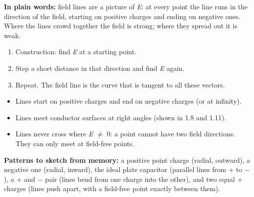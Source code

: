 \documentclass[11pt]{article}
\begin{document}
\begin{keepsection}
\begin{center}
\begin{minipage}[t]{0.950\linewidth}
\par{}\end{minipage}
\end{center}

\begin{plainbox}\textbf{In plain words:} field lines are a picture of \textit{E}: at every point the line runs in the direction of the field, starting on positive charges and ending on negative ones. Where the lines crowd together the field is strong; where they spread out it is weak.\end{plainbox}

\begin{enumerate}
\item Construction: find \textit{E} at a starting point.
\item Step a short distance in that direction and find \textit{E} again.
\item Repeat. The field line is the curve that is tangent to all these vectors.
\end{enumerate}

\begin{itemize}
\item Lines start on positive charges and end on negative charges (or at infinity).
\item Lines meet conductor surfaces at right angles (shown in 1.8 and 1.11).
\item Lines never cross where \textit{E} \ensuremath{\neq} 0: a point cannot have two field directions. They can only meet at field-free points.
\end{itemize}

\textbf{Patterns to sketch from memory:} a positive point charge (radial, outward), a negative one (radial, inward), the ideal plate capacitor (parallel lines from + to \ensuremath{-}), a + and \ensuremath{-} pair (lines bend from one charge into the other), and two equal + charges (lines push apart, with a field-free point exactly between them).


\end{keepsection}
\end{document}
